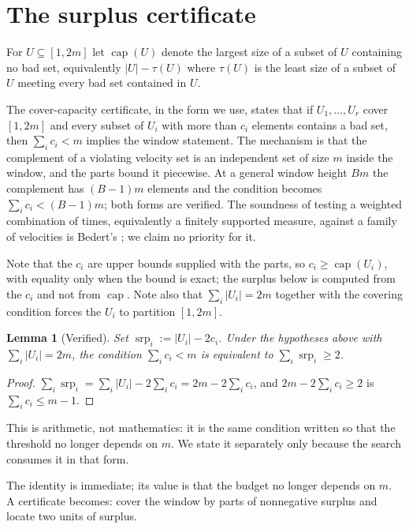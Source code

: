 \documentclass[11pt]{amsart}
\theoremstyle{plain}
\newtheorem{lemma}[theorem]{Lemma}
\theoremstyle{definition}
\newcommand{\cpt}{\operatorname{cap}}
\newcommand{\srp}{\operatorname{srp}}
\begin{document}
\section{The surplus certificate}\label{sec:surplus}

For $U \subseteq [1,2m]$ let $\cpt(U)$ denote the largest size of a subset of $U$ containing no bad
set, equivalently $|U| - \tau(U)$ where $\tau(U)$ is the least size of a subset of $U$ meeting every
bad set contained in $U$.

The cover-capacity certificate, in the form we use, states that if $U_1,\dots,U_r$ cover $[1,2m]$
and every subset of $U_i$ with more than $c_i$ elements contains a bad set, then $\sum_i c_i < m$
implies the window statement. The mechanism is that the complement of a violating velocity set is
an independent set of size $m$ inside the window, and the parts bound it piecewise. At a general
window height $Bm$ the complement has $(B-1)m$ elements and the condition becomes
$\sum_i c_i < (B-1)m$; both forms are verified. The soundness of testing a weighted combination of times, equivalently a finitely supported measure, against a family of velocities is Bedert's \cite[Lemma~2.1]{Bed}; we claim no priority for it.

Note that the $c_i$ are upper bounds supplied with the parts, so $c_i \ge \cpt(U_i)$, with equality
only when the bound is exact; the surplus below is computed from the $c_i$ and not from $\cpt$.
Note also that $\sum_i |U_i| = 2m$ together with the covering condition forces the $U_i$ to
partition $[1,2m]$.

\begin{lemma}[Verified]\label{thm:surplus}
Set $\srp_i := |U_i| - 2c_i$. Under the hypotheses above with $\sum_i |U_i| = 2m$, the condition
$\sum_i c_i < m$ is equivalent to $\sum_i \srp_i \ge 2$.
\end{lemma}

\begin{proof}
$\sum_i \srp_i = \sum_i |U_i| - 2\sum_i c_i = 2m - 2\sum_i c_i$, and $2m - 2\sum_i c_i \ge 2$ is
$\sum_i c_i \le m-1$.
\end{proof}

This is arithmetic, not mathematics: it is the same condition written so that the threshold no
longer depends on $m$. We state it separately only because the search consumes it in that form.

The identity is immediate; its value is that the budget no longer depends on $m$. A certificate
becomes: cover the window by parts of nonnegative surplus and locate two units of surplus.
\end{document}
